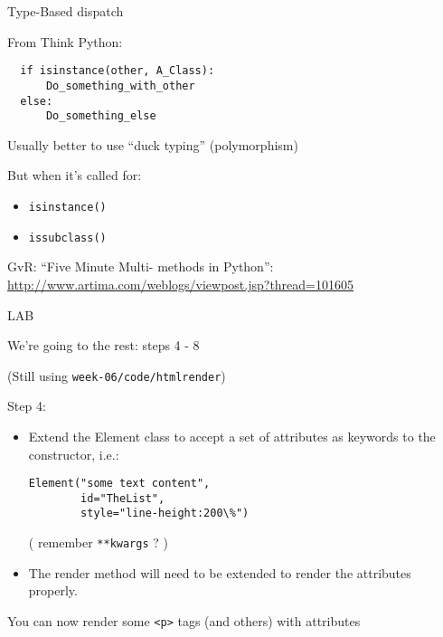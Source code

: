 \documentclass{beamer}
\begin{document}
\begin{frame}[fragile]{Type-Based dispatch}

{\Large From Think Python:}

\begin{verbatim}
  if isinstance(other, A_Class):
      Do_something_with_other
  else:
      Do_something_else
\end{verbatim}

\vfill
{\Large Usually better to use ``duck typing'' (polymorphism)}

\vfill
{\Large But when it's called for:}
\begin{itemize}
    \item \verb|isinstance()|
    \item \verb|issubclass()|
\end{itemize}

\vfill
GvR: ``Five Minute Multi- methods in Python'':\\
{\small \url{http://www.artima.com/weblogs/viewpost.jsp?thread=101605} }

\end{frame} 

\begin{frame}[fragile]{LAB}

{\Large We're going to the rest: steps 4 - 8}

{(Still using \verb|week-06/code/htmlrender|) }

\vfill
{\Large Step 4:}

\begin{itemize}
  \item Extend the Element class to accept a set of attributes as keywords to the
  constructor, i.e.:
  \begin{verbatim}
Element("some text content",
        id="TheList",
        style="line-height:200\%")
  \end{verbatim}
    ( remember \verb|**kwargs| ? )
  \item The render method will need to be extended to render the attributes properly.
\end{itemize}

\vfill
You can now render some \verb|<p>| tags (and others) with attributes  
\end{frame}
\end{document}
